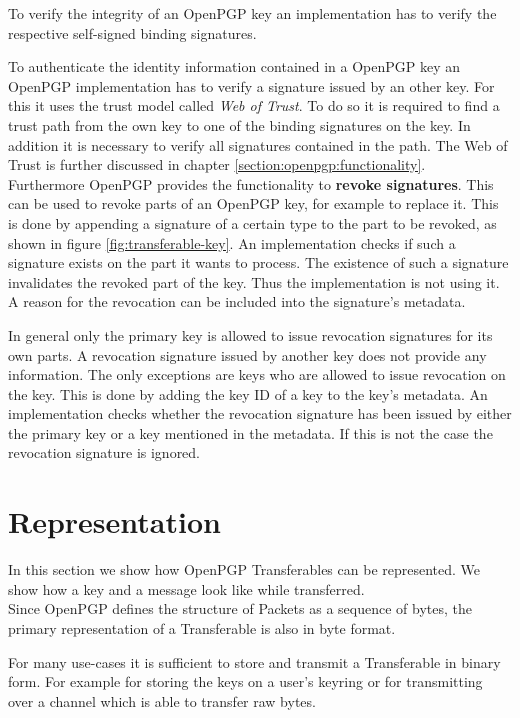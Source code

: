 To verify the integrity of an OpenPGP key an implementation has to verify the respective self-signed binding signatures. 

To authenticate the identity information contained in a OpenPGP key an OpenPGP implementation has to verify a signature issued by an other key. For this it uses the trust model called \textit{Web of Trust}. To do so it is required to find a trust path from the own key to one of the binding signatures on the key. In addition it is necessary to verify all signatures contained in the path. The Web of Trust is further discussed in chapter \ref{section:openpgp:functionality}. \\

Furthermore OpenPGP provides the functionality to \textbf{revoke signatures}. This can be used to revoke parts of an OpenPGP key, for example to replace it. This is done by appending a signature of a certain type to the part to be revoked, as shown in figure \ref{fig:transferable-key}. An implementation checks if such a signature exists on the part it wants to process. The existence of such a signature invalidates the revoked part of the key. Thus the implementation is not using it. A reason for the revocation can be included into the signature's metadata. 

In general only the primary key is allowed to issue revocation signatures for its own parts. A revocation signature issued by another key does not provide any information. The only exceptions are keys who are allowed to issue revocation on the key. This is done by adding the key ID of a key to the key's metadata. An implementation checks whether the revocation signature has been issued by either the primary key or a key mentioned in the metadata. If this is not the case the revocation signature is ignored.

\section{Representation}
\label{section:messageformat:asciia}

In this section we show how OpenPGP Transferables can be represented. We show how a key and a message look like while transferred. \\

Since OpenPGP defines the structure of Packets as a sequence of bytes, the primary representation of a Transferable is also in byte format.

For many use-cases it is sufficient to store and transmit a Transferable in binary form. For example for storing the keys on a user's keyring or for transmitting over a channel which is able to transfer raw bytes. \\


